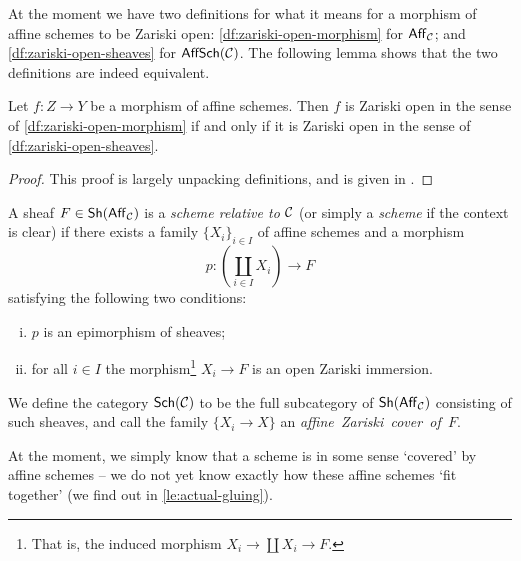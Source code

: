         \bigskip

        At the moment we have two definitions for what it means for a morphism of affine schemes to be Zariski open: \cref{df:zariski-open-morphism} for $\mathsf{Aff}_{\mathcal{C}}$; and \cref{df:zariski-open-sheaves} for $\mathsf{AffSch}(\mathcal{C})$.
        The following lemma shows that the two definitions are indeed equivalent.

        \begin{lemma}\label{le:zariski-open-sheaves-and-morphisms}
            Let $f\colon Z\to Y$ be a morphism of affine schemes.
            Then $f$ is Zariski open in the sense of \cref{df:zariski-open-morphism} if and only if it is Zariski open in the sense of \cref{df:zariski-open-sheaves}.
        \end{lemma}

        \begin{proof}
            This proof is largely unpacking definitions, and is given in \cite{Toen:2005wxa}.
        \end{proof}

        \begin{definition}\label{df:relative-scheme}
            A sheaf $F\in\mathsf{Sh}(\mathsf{Aff}_{\mathcal{C}})$ is a \emph{scheme relative to $\mathcal{C}$} (or simply a \emph{scheme} if the context is clear) if there exists a family $\{X_i\}_{i\in I}$ of affine schemes and a morphism
            \begin{equation*}
                p\colon\left(\coprod_{i\in I}X_i\right)\to F
            \end{equation*}
            satisfying the following two conditions:
            \begin{enumerate}[(i)]
                \item $p$ is an epimorphism of sheaves;
                \item for all $i\in I$ the morphism\footnote{
                    That is, the induced morphism $X_i\to\coprod X_i\to F$.
                } $X_i\to F$ is an open Zariski immersion.
            \end{enumerate}
            We define the category $\mathsf{Sch}(\mathcal{C})$ to be the full subcategory of $\mathsf{Sh}(\mathsf{Aff}_{\mathcal{C}})$ consisting of such sheaves, and call the family $\{X_i\to X\}$ an \mbox{\emph{affine Zariski cover of $F$}}.
        \end{definition}

        At the moment, we simply know that a scheme is in some sense `covered' by affine schemes -- we do not yet know exactly how these affine schemes `fit together' (we find out in \cref{le:actual-gluing}).
    

